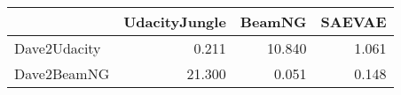 \begin{tabular}{lrrr}
\toprule
{} &  UdacityJungle &  BeamNG &  SAEVAE \\
\midrule
Dave2Udacity &          0.211 &  10.840 &   1.061 \\
Dave2BeamNG  &         21.300 &   0.051 &   0.148 \\
\bottomrule
\end{tabular}
